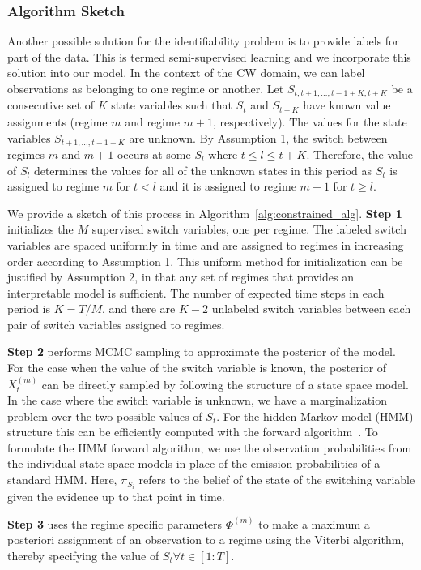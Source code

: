 \subsubsection{Algorithm Sketch}
Another possible solution for the identifiability problem is to provide labels for part of the data. This is termed semi-supervised learning and we incorporate this solution into our model. In the context of the CW domain, we can label observations as belonging to one regime or another. Let $S_{t, t+1,\ldots, t-1+K,t+K}$ be a consecutive set of $K$ state variables such that $S_t$ and $S_{t+K}$ have known value assignments (regime $m$ and regime $m+1$, respectively). The values for the state variables $S_{t+1,\ldots,t-1+K}$ are unknown. By Assumption 1, the switch between regimes $m$ and $m+1$ occurs at some $S_l$ where $t \leq l \leq t+K$. Therefore, the value of $S_l$ determines the values for all of the unknown states in this period as $S_t$ is assigned to regime $m$ for $t<l$ and it is assigned to regime $m+1$ for $t \geq l$.

We provide a sketch of this process in Algorithm~\ref{alg:constrained_alg}. \textbf{Step 1} initializes the $M$ supervised switch variables, one per regime. The labeled switch variables are spaced uniformly in time and are assigned to regimes in increasing order according to Assumption 1. This uniform method for initialization can be justified  by Assumption 2, in that  any set of regimes  that provides an interpretable model is sufficient. The number of expected  time steps in each period is $K=T/M$, and there are  $K-2$ unlabeled switch variables between each pair of  switch variables assigned to regimes.

\textbf{Step 2} performs MCMC sampling to approximate the posterior of the model. For the case when the value of the switch variable is known, the posterior of $X^{(m)}_t$ can be directly sampled by following the structure of a state space model. In the case where the switch variable is unknown, we have a marginalization problem over the two possible values of $S_t$. For the hidden Markov model (HMM) structure this can be efficiently computed with the forward algorithm~\citep{shumway2000time}. To formulate the HMM forward algorithm, we use the observation probabilities from the individual state space models in place of the emission probabilities of a standard HMM. Here, $\pi_{S_i}$ refers to the belief of the state of the switching variable given the evidence up to that point in time.

\textbf{Step 3} uses the regime specific parameters $\Phi^{(m)}$ to make a maximum a posteriori assignment of an observation to a regime using the Viterbi algorithm, thereby specifying the value of $S_t \forall t \in [1:T]$.

